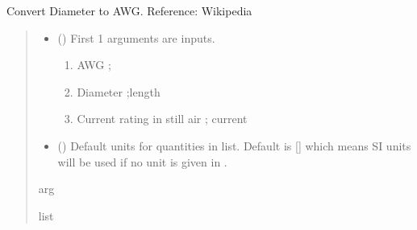 \documentclass[letterpaper,10pt,english]{sphinxmanual}
\begin{document}

\begin{fulllineitems}
\label{\detokenize{components:components.Dia2AWG}}
\pysigstartsignatures
{}
\pysigstopsignatures
\sphinxAtStartPar
Convert Diameter to AWG.
Reference:  Wikipedia
\begin{quote}\begin{description}
\begin{itemize}
\item {} 
\sphinxAtStartPar
{} () \textendash{} 
\sphinxAtStartPar
First 1 arguments are inputs.
\begin{enumerate}
%
\item {} 
\sphinxAtStartPar
AWG ;

\item {} 
\sphinxAtStartPar
Diameter ;length

\item {} 
\sphinxAtStartPar
Current rating in still air ; current

\end{enumerate}


\item {} 
\sphinxAtStartPar
{} (\sphinxstyleliteralemphasis{\sphinxupquote{, }}) \textendash{} Default units for quantities in  list. Default is {[}{]} which means SI units will be used if no unit is given in .

\end{itemize}

\sphinxAtStartPar
arg

\sphinxAtStartPar
list

\end{description}\end{quote}

\end{fulllineitems}
\end{document}
